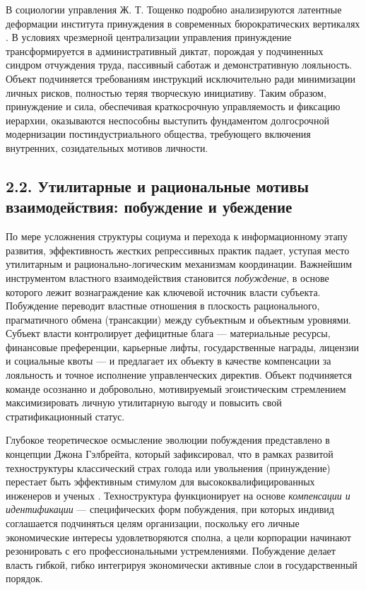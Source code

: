 В социологии управления Ж. Т. Тощенко подробно анализируются латентные деформации института принуждения в современных бюрократических вертикалях \cite{Toschenko}. В условиях чрезмерной централизации управления принуждение трансформируется в административный диктат, порождая у подчиненных синдром отчуждения труда, пассивный саботаж и демонстративную лояльность. Объект подчиняется требованиям инструкций исключительно ради минимизации личных рисков, полностью теряя творческую инициативу. Таким образом, принуждение и сила, обеспечивая краткосрочную управляемость и фиксацию иерархии, оказываются неспособны выступить фундаментом долгосрочной модернизации постиндустриального общества, требующего включения внутренних, созидательных мотивов личности.

\subsection{2.2. Утилитарные и рациональные мотивы взаимодействия: побуждение и убеждение}

По мере усложнения структуры социума и перехода к информационному этапу развития, эффективность жестких репрессивных практик падает, уступая место утилитарным и рационально-логическим механизмам координации. Важнейшим инструментом властного взаимодействия становится \textit{побуждение}, в основе которого лежит вознаграждение как ключевой источник власти субъекта. Побуждение переводит властные отношения в плоскость рационального, прагматичного обмена (трансакции) между субъектным и объектным уровнями. Субъект власти контролирует дефицитные блага — материальные ресурсы, финансовые преференции, карьерные лифты, государственные награды, лицензии и социальные квоты — и предлагает их объекту в качестве компенсации за лояльность и точное исполнение управленческих директив. Объект подчиняется команде осознанно и добровольно, мотивируемый эгоистическим стремлением максимизировать личную утилитарную выгоду и повысить свой стратификационный статус.

Глубокое теоретическое осмысление эволюции побуждения представлено в концепции Джона Гэлбрейта, который зафиксировал, что в рамках развитой техноструктуры классический страх голода или увольнения (принуждение) перестает быть эффективным стимулом для высококвалифицированных инженеров и ученых \cite{Gelbreyt}. Техноструктура функционирует на основе \textit{компенсации и идентификации} — специфических форм побуждения, при которых индивид соглашается подчиняться целям организации, поскольку его личные экономические интересы удовлетворяются сполна, а цели корпорации начинают резонировать с его профессиональными устремлениями. Побуждение делает власть гибкой, гибко интегрируя экономически активные слои в государственный порядок.

